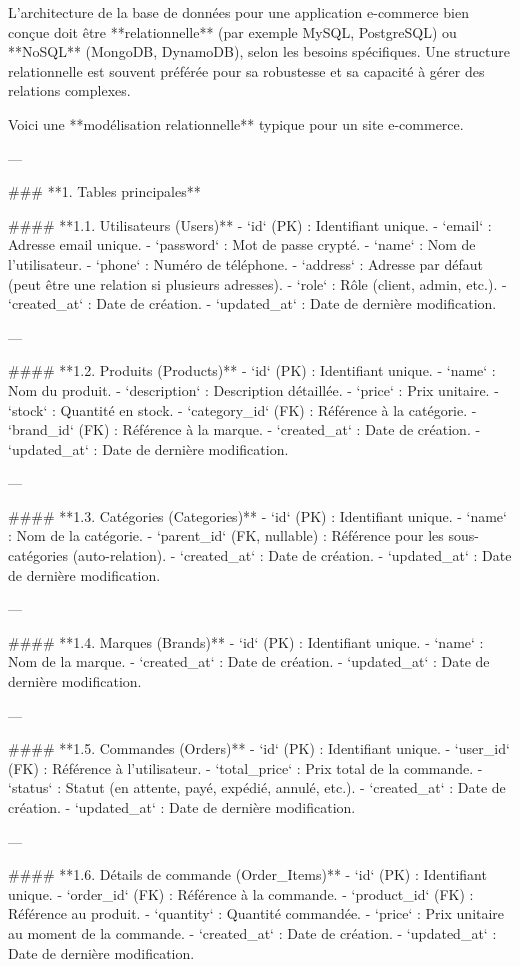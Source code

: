 L’architecture de la base de données pour une application e-commerce bien conçue doit être **relationnelle** (par exemple MySQL, PostgreSQL) ou **NoSQL** (MongoDB, DynamoDB), selon les besoins spécifiques. Une structure relationnelle est souvent préférée pour sa robustesse et sa capacité à gérer des relations complexes.

Voici une **modélisation relationnelle** typique pour un site e-commerce.

---

### **1. Tables principales**

#### **1.1. Utilisateurs (Users)**
- `id` (PK) : Identifiant unique.
- `email` : Adresse email unique.
- `password` : Mot de passe crypté.
- `name` : Nom de l'utilisateur.
- `phone` : Numéro de téléphone.
- `address` : Adresse par défaut (peut être une relation si plusieurs adresses).
- `role` : Rôle (client, admin, etc.).
- `created_at` : Date de création.
- `updated_at` : Date de dernière modification.

---

#### **1.2. Produits (Products)**
- `id` (PK) : Identifiant unique.
- `name` : Nom du produit.
- `description` : Description détaillée.
- `price` : Prix unitaire.
- `stock` : Quantité en stock.
- `category_id` (FK) : Référence à la catégorie.
- `brand_id` (FK) : Référence à la marque.
- `created_at` : Date de création.
- `updated_at` : Date de dernière modification.

---

#### **1.3. Catégories (Categories)**
- `id` (PK) : Identifiant unique.
- `name` : Nom de la catégorie.
- `parent_id` (FK, nullable) : Référence pour les sous-catégories (auto-relation).
- `created_at` : Date de création.
- `updated_at` : Date de dernière modification.

---

#### **1.4. Marques (Brands)**
- `id` (PK) : Identifiant unique.
- `name` : Nom de la marque.
- `created_at` : Date de création.
- `updated_at` : Date de dernière modification.

---

#### **1.5. Commandes (Orders)**
- `id` (PK) : Identifiant unique.
- `user_id` (FK) : Référence à l'utilisateur.
- `total_price` : Prix total de la commande.
- `status` : Statut (en attente, payé, expédié, annulé, etc.).
- `created_at` : Date de création.
- `updated_at` : Date de dernière modification.

---

#### **1.6. Détails de commande (Order_Items)**
- `id` (PK) : Identifiant unique.
- `order_id` (FK) : Référence à la commande.
- `product_id` (FK) : Référence au produit.
- `quantity` : Quantité commandée.
- `price` : Prix unitaire au moment de la commande.
- `created_at` : Date de création.
- `updated_at` : Date de dernière modification.

